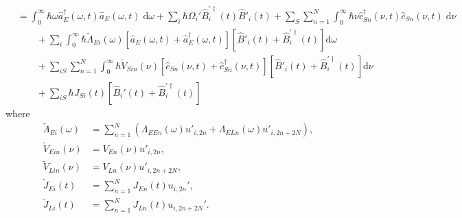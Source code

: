 \documentclass{article}
\begin{document}
\begin{equation}
\begin{split}
&= \int_0^\infty\hbar\omega\hat{a}_E^\dagger(\omega,t)\hat{a}_E(\omega,t)\;\mathrm{d}\omega + \sum_i\hbar\Omega_i'\hat{B}_i^{\prime\dagger}(t)\hat{B}'_i(t) + \sum_{S}\sum_{n = 1}^N\int_0^\infty\hbar\nu\hat{c}_{Sn}^\dagger(\nu,t)\hat{c}_{Sn}(\nu,t)\;\mathrm{d}\nu\\
&\qquad + \sum_i\int_0^\infty\hbar\tilde{\Lambda}_{Ei}(\omega)\left[\hat{a}_E(\omega,t) + \hat{a}_E^\dagger(\omega,t)\right]\left[\hat{B}'_i(t) + \hat{B}_i^{\prime\dagger}(t)\right]\mathrm{d}\omega\\
&\qquad + \sum_{iS}\sum_{n = 1}^{N}\int_0^\infty\hbar\tilde{V}_{Sin}(\nu)\left[\hat{c}_{Sn}(\nu,t) + \hat{c}_{Sn}^\dagger(\nu,t)\right]\left[\hat{B}'_i(t) + \hat{B}_i^{\prime\dagger}(t)\right]\mathrm{d}\nu\\
&\qquad + \sum_{iS}\hbar J_{Si}(t)\left[\hat{B}_i'(t) + \hat{B}_i^{\prime\dagger}(t)\right]
\end{split}
\end{equation}
where
\begin{equation}
\begin{split}
\tilde{\Lambda}_{Ei}(\omega) 
&= \sum_{n = 1}^N\left(\Lambda_{EEn}(\omega)u'_{i,2n} + \Lambda_{ELn}(\omega)u'_{i,2n+2N}\right),\\
\tilde{V}_{Ein}(\nu) &= V_{En}(\nu)u'_{i,2n},\\
\tilde{V}_{Lin}(\nu) &= V_{Ln}(\nu)u'_{i,2n + 2N},\\
\tilde{J}_{Ei}(t) &= \sum_{n=1}^NJ_{En}(t)u_{i,2n}',\\
\tilde{J}_{Li}(t) &= \sum_{n=1}^NJ_{Ln}(t)u_{i,2n+2N}'.
\end{split}
\end{equation}
\end{document}
